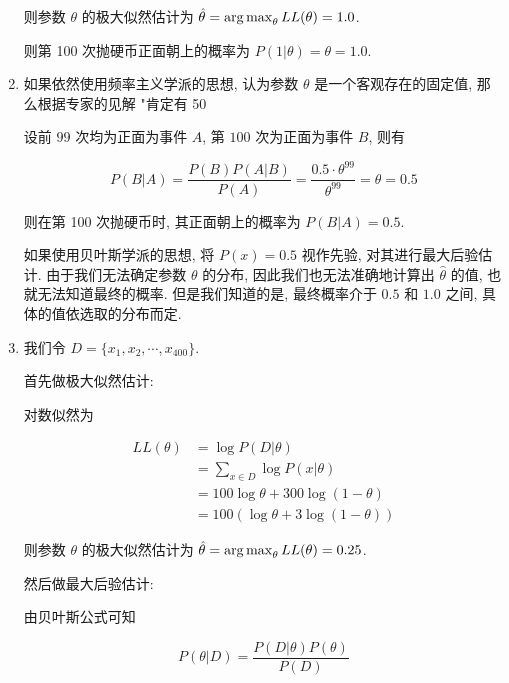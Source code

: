 \documentclass[answers]{exam}  %
\begin{document}
\begin{questions}
\begin{solution}
\begin{enumerate}
            则参数 $\theta$ 的极大似然估计为 $\displaystyle \hat{\theta} = \operatorname{arg\,max}_{\theta} LL(\theta) = 1.0$.

            则第 100 次抛硬币正面朝上的概率为 $P(1|\theta) = \theta = 1.0$.

      \item

            如果依然使用频率主义学派的思想, 认为参数 $\theta$ 是一个客观存在的固定值, 那么根据专家的见解 "肯定有 50%

            设前 $99$ 次均为正面为事件 $A$, 第 $100$ 次为正面为事件 $B$, 则有

            $$
              P(B|A) = \frac{P(B)P(A|B)}{P(A)} = \frac{0.5 \cdot \theta^{99}}{\theta^{99}} = \theta = 0.5
            $$

            则在第 100 次抛硬币时, 其正面朝上的概率为 $P(B|A) = 0.5$.

            如果使用贝叶斯学派的思想, 将 $P(x)=0.5$ 视作先验, 对其进行最大后验估计. 由于我们无法确定参数 $\theta$ 的分布, 因此我们也无法准确地计算出 $\hat{\theta}$ 的值, 也就无法知道最终的概率. 但是我们知道的是, 最终概率介于 $0.5$ 和 $1.0$ 之间, 具体的值依选取的分布而定.


      \item

            我们令 $D = \{ x_1, x_2, \cdots, x_{400} \}$.

            首先做极大似然估计:

            对数似然为

            $$
              \begin{aligned}
                LL(\theta) & = \log P(D | \theta)                  \\
                           & = \sum_{x \in D} \log P(x|\theta)     \\
                           & = 100\log \theta + 300\log (1-\theta) \\
                           & = 100(\log \theta + 3 \log(1-\theta))
              \end{aligned}
            $$

            则参数 $\theta$ 的极大似然估计为 $\displaystyle \hat{\theta} = \operatorname{arg\,max}_{\theta} LL(\theta) = 0.25$.

            然后做最大后验估计:

            由贝叶斯公式可知

            $$
              P(\theta|D) = \frac{P(D|\theta)P(\theta)}{P(D)}
            $$


\end{enumerate}
\end{solution}
\end{questions}
\end{document}
